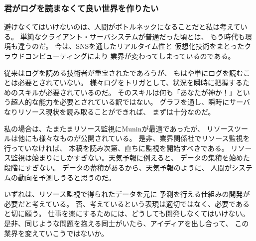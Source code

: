 \subsubsection{君がログを読まなくて良い世界を作りたい}
避けなくてはいけないのは、人間がボトルネックになることだと私は考えている。
単純なクライアント・サーバシステムが普通だった頃とは、
もう時代も環境も違うのだ。
今は、SNSを通したリアルタイム性と
仮想化技術をまとったクラウドコンピューティングにより
業界が変わってしまっているのである。

従来はログを読める技術者が重宝されたであろうが、
もはや単にログを読むことは必要とされていない。
様々ログをトリガとして、状況を瞬時に把握するためのスキルが必要されているのだ。
そのスキルは何も「あなたが神か！」という超人的な能力を必要とされている訳ではない。
グラフを通し、瞬時にサーバなりリソース現状を読み取ることができれば、
まずは十分なのだ。

私の場合は、たまたまリソース監視にMuninが最適であったが、
リソースツールは他にも様々なものが公開されている。
是非、業界関係社でリソース監視を行っていなければ、
本稿を読み次第、直ちに監視を開始すべきである。
リソース監視は始まりにしかすぎない。天気予報に例えると、
データの集積を始めた段階にすぎない。
データの蓄積があるから、天気予報のように、
人間がシステムの動向を予測しうると思うのだ。

いずれは、リソース監視で得られたデータを元に
予測を行える仕組みの開発が必要だと考えている。
否、考えているという表現は適切ではなく、必要であると切に願う。
仕事を楽にするためには、どうしても開発しなくてはいけない。
是非、同じような問題を抱える同士がいたら、アイディアを出し合って、
この業界を変えていこうではないか。


